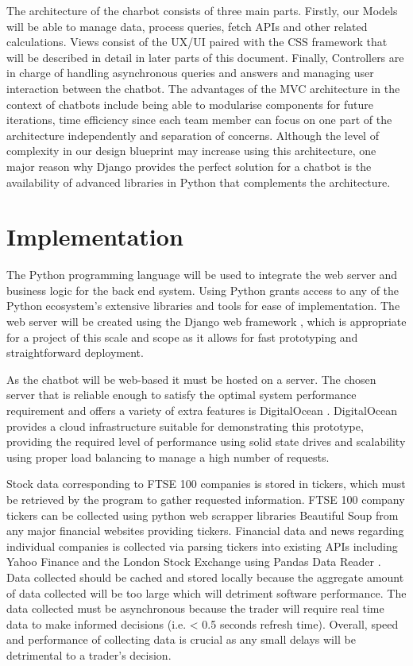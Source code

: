 \documentclass[]{IEEEtran}
\begin{document}
The architecture of the charbot consists of three main parts. Firstly, our Models will be able to manage data, process queries, fetch APIs and other related calculations. Views consist of the UX/UI paired with the CSS framework that will be described in detail in later parts of this document. Finally, Controllers are in charge of handling asynchronous queries and answers and managing user interaction between the chatbot. The advantages of the MVC architecture in the context of chatbots include being able to modularise components for future iterations, time efficiency since each team member can focus on one part of the architecture independently and separation of concerns. Although the level of complexity in our design blueprint may increase using this architecture, one major reason why Django provides the perfect solution for a chatbot is the availability of advanced libraries in Python that complements the architecture.

\section{Implementation}
The Python programming language will be used to integrate the web server and business logic for the back end system. Using Python grants access to any of the Python ecosystem’s extensive libraries and tools \cite{python1} for ease of implementation. The web server will be created using the Django web framework \cite{django}, which is appropriate for a project of this scale and scope as it allows for fast prototyping and straightforward deployment.

As the chatbot will be web-based it must be hosted on a server. The chosen server that is reliable enough to satisfy the optimal system performance requirement and offers a variety of extra features is DigitalOcean \cite{digitalOcean}. DigitalOcean provides a cloud infrastructure suitable for demonstrating this prototype, providing the required level of performance using solid state drives and scalability using proper load balancing to manage a high number of requests. 

Stock data corresponding to FTSE 100 companies is stored in tickers, which must be retrieved by the program to gather requested information. FTSE 100 company tickers can be collected using python web scrapper libraries Beautiful Soup \cite{beauty} from any major financial websites providing tickers. Financial data and news regarding individual companies is collected via parsing tickers into existing APIs including Yahoo Finance and the London Stock Exchange using Pandas Data Reader \cite{panda}. Data collected should be cached and stored locally because the aggregate amount of data collected will be too large which will detriment software performance. The data collected must be asynchronous because the trader will require real time data to make informed decisions (i.e. < 0.5 seconds refresh time). Overall, speed and performance of collecting data is crucial as any small delays will be detrimental to a trader’s decision.
\end{document}
